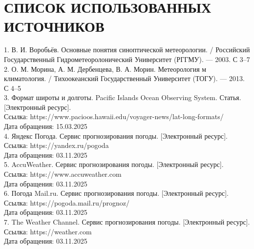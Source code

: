 \chapter*{СПИСОК ИСПОЛЬЗОВАННЫХ ИСТОЧНИКОВ}

\hspace{-1.25cm}
1. В. И. Воробьёв. Основные понятия синоптической метеорологии. / Российский Государственный Гидрометеоролонический Университет  (РГГМУ). --- 2003. С 3--7 \\

\hspace{-1.25cm}
2. О. М. Морина, А. М. Дербенцева, В. А. Морин. Метеорология м климатология. / Тихоокеанский Государственный Университет (ТОГУ). --- 2013. С 4--5 \\

\hspace{-1.25cm}
3. Формат широты и долготы. Pacific Islands Ocean Observing System. Статья. [Электронный ресурс]. \\
Ссылка: https://www.pacioos.hawaii.edu/voyager-news/lat-long-formats/ \\
Дата обращения: 15.03.2025 \\

\hspace{-1.25cm}
4. Яндекс Погода. Сервис прогнозирования погоды. [Электронный ресурс]. \\
Ссылка: https://yandex.ru/pogoda \\
Дата обращения: 03.11.2025 \\

\hspace{-1.25cm}
5. AccuWeather. Сервис прогнозирования погоды. [Электронный ресурс]. \\
Ссылка: https://www.accuweather.com \\
Дата обращения: 03.11.2025 \\

\hspace{-1.25cm}
6. Погода Mail.ru. Сервис прогнозирования погоды. [Электронный ресурс]. \\
Ссылка: https://pogoda.mail.ru/prognoz/ \\
Дата обращения: 03.11.2025 \\

\hspace{-1.25cm}
7. The Weather Channel. Сервис прогнозирования погоды. [Электронный ресурс]. \\
Ссылка: https://weather.com \\
Дата обращения: 03.11.2025 \\

